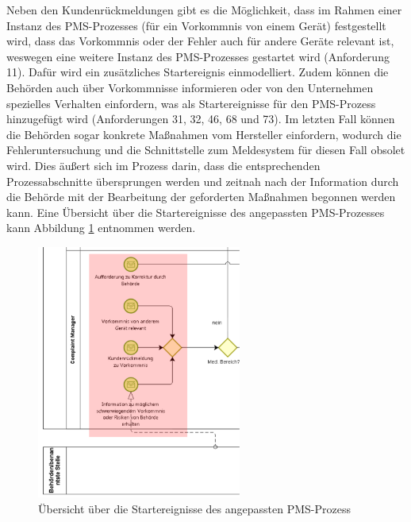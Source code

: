 \documentclass[a4paper,12pt]{report}
\begin{document}
Neben den Kundenrückmeldungen gibt es die Möglichkeit, dass im Rahmen einer Instanz des PMS-Prozesses (für ein Vorkommnis von einem Gerät) festgestellt wird, dass das Vorkommnis oder der Fehler auch für andere Geräte relevant ist, weswegen eine weitere Instanz des PMS-Prozesses gestartet wird (Anforderung 11). Dafür wird ein zusätzliches Startereignis einmodelliert. Zudem können die Behörden auch über Vorkommnisse informieren oder von den Unternehmen spezielles Verhalten einfordern, was als Startereignisse für den PMS-Prozess hinzugefügt wird (Anforderungen 31, 32, 46, 68 und 73). Im letzten Fall können die Behörden sogar konkrete Maßnahmen vom Hersteller einfordern, wodurch die Fehleruntersuchung und die Schnittstelle zum Meldesystem für diesen Fall obsolet wird. Dies äußert sich im Prozess darin, dass die entsprechenden Prozessabschnitte übersprungen werden und zeitnah nach der Information durch die Behörde mit der Bearbeitung der geforderten Maßnahmen begonnen werden kann. Eine Übersicht über die Startereignisse des angepassten PMS-Prozesses kann Abbildung \ref{pms_process_starts} entnommen werden.
\begin{figure}[ht]
\centering
\includegraphics[width=0.6\textwidth]{Images/pms_process_starts}
\caption[Übersicht über die Startereignisse des angepassten PMS-Prozess]{Übersicht über die Startereignisse des angepassten PMS-Prozess}
\label{pms_process_starts}
\end{figure}
\end{document}
